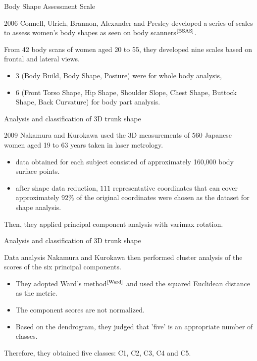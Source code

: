 \documentclass[10pt]{beamer}
\newcommand{\bib}[1]{$^\text{\cite{#1}}$}
\begin{document}
\begin{frame}{Body Shape Assessment Scale}
	\begin{block}{2006}
		Connell, Ulrich, Brannon, Alexander and Presley developed a series of scales to assess women's body shapes as seen on body scanners\bib{BSAS}.

		From 42 body scans of women aged 20 to 55, they developed nine scales based on frontal and lateral views.\pause
		\begin{itemize}
			\item 3 (Body Build, Body Shape, Posture) were for whole body analysis,\pause
			\item 6 (Front Torso Shape, Hip Shape, Shoulder Slope, Chest Shape, Buttock Shape, Back Curvature) for body part analysis.
		\end{itemize}
	\end{block}
\end{frame}

\begin{frame}{Analysis and classification of 3D trunk shape}
	\begin{block}{2009}
		Nakamura and Kurokawa used the 3D measurements of 560 Japanese women aged 19 to 63 years taken in laser metrology.
		\begin{itemize}
			\item data obtained for each subject consisted of approximately 160,000 body surface points.
			\item after shape data reduction, $111$ representative coordinates that can cover approximately $92\%$ of the original coordinates were chosen as the dataset for shape analysis.
		\end{itemize}
		Then, they applied principal component analysis with varimax rotation.
	\end{block}
\end{frame}

\begin{frame}{Analysis and classification of 3D trunk shape}
	\begin{block}{Data analysis}
		Nakamura and Kurokawa then performed cluster analysis of the scores of the six principal components.
		\begin{itemize}
			\item They adopted Ward's method\bib{Ward} and used the squared Euclidean distance as the metric.
			\item The component scores are not normalized.
			\item Based on the dendrogram, they judged that 'five' is an appropriate number of classes.
		\end{itemize}
		Therefore, they obtained five classes: C1, C2, C3, C4 and C5.
	\end{block}
\end{frame}
\end{document}
